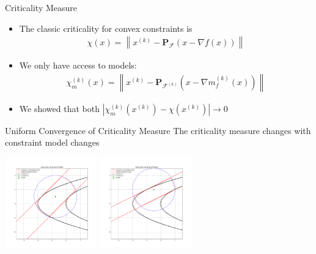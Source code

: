 \documentclass{beamer}
\newcommand{\xk}{{{x}^{(k)}}}
\newcommand{\feasible}{\mathcal F}
\newcommand{\feasiblek}{\mathcal F^{(k)}}
\newcommand{\proj}{\textbf{P}}
\begin{document}
\begin{frame}{Criticality Measure}
	\begin{itemize}
		\item The classic criticality for convex constraints is
\begin{align*}
\chi(x) = \left\|\xk - \proj_{\feasible}\left(x - \nabla f(x)\right)\right\|
\end{align*}
		\item We only have access to models:
\begin{align*}
\chi_m^{(k)}(x) = \left\|\xk - \proj_{\feasiblek}\left(x - \nabla m_f^{(k)}(x)\right)\right\|
\end{align*}
		\item We showed that both $\left|\chi_m^{(k)}\left(\xk\right) - \chi\left(\xk\right)\right| \to 0$ 
	\end{itemize}
\end{frame}



\begin{frame}{Uniform Convergence of Criticality Measure}
	The criticality measure changes with constraint model changes
	\begin{center}
		\includegraphics[width=150px]{images/modeled_constraints_2.png}
		\includegraphics[width=150px]{images/modeled_constraints_3.png}
	\end{center}
\end{frame}


\end{document}
